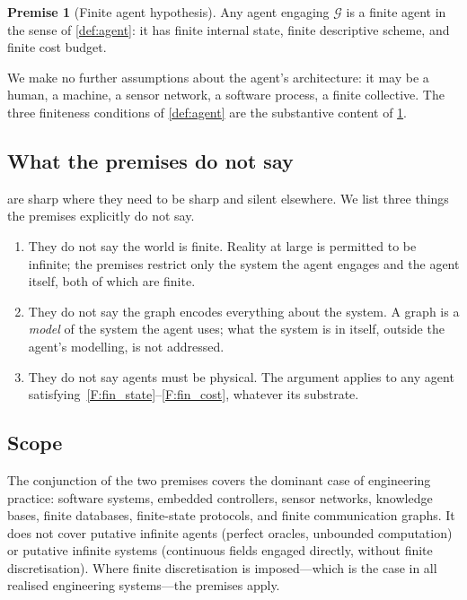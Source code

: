 \documentclass[11pt,a4paper]{article}
\theoremstyle{thmstyle}
\theoremstyle{definition}
\newtheorem{axiom}{Premise}
\theoremstyle{remark}
\newcommand{\Graph}{\mathcal{G}}
\begin{document}
\begin{axiom}[Finite agent hypothesis]
\label{ax:agent}
Any agent engaging $\Graph$ is a finite agent in the sense of
\cref{def:agent}: it has finite internal state, finite descriptive
scheme, and finite cost budget.
\end{axiom}

We make no further assumptions about the agent's architecture: it
may be a human, a machine, a sensor network, a software process, a
finite collective. The three finiteness conditions of
\cref{def:agent} are the substantive content of \cref{ax:agent}.

\subsection{What the premises do not say}

 are sharp where they need to be sharp and
silent elsewhere. We list three things the premises explicitly do
not say.

\begin{enumerate}[nosep,leftmargin=*]
\item They do not say the world is finite. Reality at large is
permitted to be infinite; the premises restrict only the system the
agent engages and the agent itself, both of which are finite.
\item They do not say the graph encodes everything about the system.
A graph is a \emph{model} of the system the agent uses; what the
system is in itself, outside the agent's modelling, is not
addressed.
\item They do not say agents must be physical. The argument applies
to any agent satisfying~\ref{F:fin_state}--\ref{F:fin_cost},
whatever its substrate.
\end{enumerate}

\subsection{Scope}

The conjunction of the two premises covers the dominant case of
engineering practice: software systems, embedded controllers,
sensor networks, knowledge bases, finite databases, finite-state
protocols, and finite communication graphs. It does not cover
putative infinite agents (perfect oracles, unbounded computation) or
putative infinite systems (continuous fields engaged directly,
without finite discretisation). Where finite discretisation is
imposed---which is the case in all realised engineering
systems---the premises apply.
\end{document}
